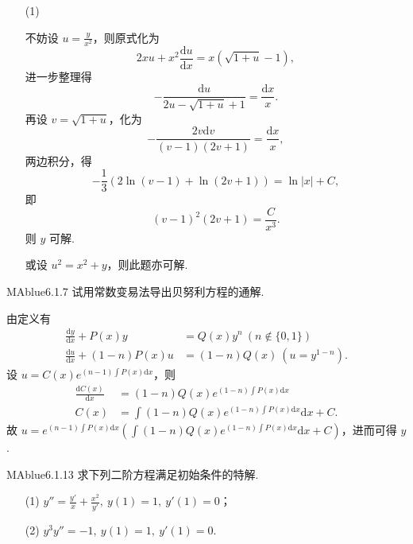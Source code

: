 \begin{enumerate}
    \item[(1)]
    \begin{solution}
        不妨设 $u = \frac y {x^2}$，则原式化为
        \[
            2xu + x^2 \frac{\mathrm du}{\mathrm dx} = x \left( \sqrt{1+u} - 1 \right),
        \]
        进一步整理得
        \[
            - \frac{\mathrm du}{2u - \sqrt{1+u} + 1} = \frac {\mathrm dx} x.
        \]
        再设 $v = \sqrt{1+u}$，化为
        \[
            - \frac{2v \mathrm dv}{(v-1)(2v+1)} = \frac {\mathrm dx} x,
        \]
        两边积分，得
        \[
            -\frac 1 3 \left( 2 \ln(v-1) + \ln(2v+1) \right) = \ln|x| + C,
        \]
        即
        \[
            (v-1)^2(2v+1) = \frac C {x^3}.
        \]
        则 $y$ 可解.
    \end{solution}
    或设 $u^2 = x^2 + y$，则此题亦可解.
\end{enumerate}

\begin{problem}{MAblue}{6.1.7}
    试用常数变易法导出贝努利方程的通解.
\end{problem}

\begin{solution}
    由定义有
    \begin{align*}
        \frac{\mathrm dy}{\mathrm dx} + P(x) y &= Q(x) y^n \ (n \not\in \{ 0, 1 \} ) \\
        \frac{\mathrm du}{\mathrm dx} + (1-n) P(x) u &= (1-n) Q(x) \ (u = y^{1-n}).
    \end{align*}
    设 $u = C(x) e^{(n-1) \int P(x) \mathrm dx}$，则
    \begin{align*}
        \frac{\mathrm d C(x)}{\mathrm dx} &= (1-n)Q(x)e^{(1-n) \int P(x) \mathrm dx} \\
        C(x) &= \int (1-n)Q(x)e^{(1-n) \int P(x) \mathrm dx} \mathrm dx + C.
    \end{align*}
    故 $u = e^{(n-1) \int P(x) \mathrm dx} \left( \int (1-n)Q(x)e^{(1-n) \int P(x) \mathrm dx} \mathrm dx + C \right)$，进而可得 $y$.
\end{solution}

\begin{problem}{MAblue}{6.1.13}
    求下列二阶方程满足初始条件的特解.
    \begin{enumerate}
        \item[(1)]
        $y'' = \frac {y'} x + \frac{x^2}{y'},\ y(1) = 1,\ y'(1) = 0$；
        \item[(2)]
        $y^3y'' = -1,\ y(1) = 1,\ y'(1) = 0$.
    \end{enumerate}
\end{problem}


